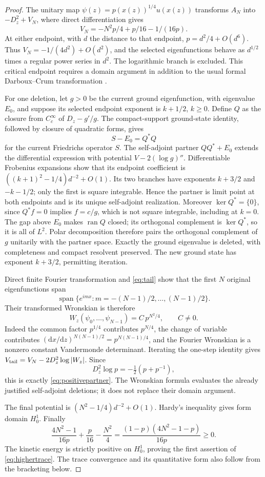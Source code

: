\documentclass[10pt]{article}
\newcommand{\dd}{\mathrm d}
\begin{document}
\begin{proof}
The unitary map $\psi(z)=p(x(z))^{1/4}u(x(z))$ transforms $A_N$
into $-D_z^2+V_N$, where direct differentiation gives
\[
V_N=-N^2p/4+p/16-1/(16p).
\]
At either endpoint, with $d$ the distance to that endpoint,
$p=d^2/4+O(d^6)$. Thus $V_N=-1/(4d^2)+O(d^2)$, and the
selected eigenfunctions behave as $d^{1/2}$ times a regular power
series in $d^2$. The logarithmic branch is excluded. This critical
endpoint requires a domain argument in addition to the usual formal
Darboux--Crum transformation \cite{crum}.

For one deletion, let $g>0$ be the current ground eigenfunction,
with eigenvalue $E_0$, and suppose its selected endpoint exponent is
$k+1/2$, $k\ge0$. Define $Q$ as the closure from $C_c^\infty$ of
$D_z-g'/g$. The compact-support ground-state identity, followed by
closure of quadratic forms, gives
\[
S-E_0=Q^*Q
\]
for the current Friedrichs operator $S$. The self-adjoint partner
$QQ^*+E_0$ extends the differential expression with potential
$V-2(\log g)''$. Differentiable Frobenius expansions show that its
endpoint coefficient is $((k+1)^2-1/4)d^{-2}+O(1)$.
Its two branches have exponents $k+3/2$ and $-k-1/2$; only the
first is square integrable. Hence the partner is limit point at
both endpoints and is its unique self-adjoint realization.
Moreover $\ker Q^*=\{0\}$, since $Q^*f=0$ implies $f=c/g$,
which is not square integrable, including at $k=0$.
The gap above $E_0$ makes $\operatorname{ran}Q$ closed; its orthogonal
complement is $\ker Q^*$, so it is all of $L^2$.
Polar decomposition therefore pairs the orthogonal complement of
$g$ unitarily with the partner space. Exactly the ground eigenvalue
is deleted, with completeness and compact resolvent preserved.
The new ground state has exponent $k+3/2$, permitting iteration.

Direct finite Fourier transformation and \eqref{eq:tail} show that
the first $N$ original eigenfunctions span
\[
\operatorname{span}\{e^{imx}:m=-(N-1)/2,\ldots,(N-1)/2\}.
\]
Their transformed Wronskian is therefore
\[
W_z(\psi_0,\ldots,\psi_{N-1})=C\,p^{N^2/4},\qquad C\ne0.
\]
Indeed the common factor $p^{1/4}$ contributes $p^{N/4}$,
the change of variable contributes
$(\dd x/\dd z)^{N(N-1)/2}=p^{N(N-1)/4}$, and the Fourier
Wronskian is a nonzero constant Vandermonde determinant.
Iterating the one-step identity gives
$V_{\rm tail}=V_N-2D_z^2\log|W_z|$.
Since
\[
D_z^2\log p=-\tfrac12(p+p^{-1}),
\]
this is exactly \eqref{eq:positivepartner}.
The Wronskian formula evaluates the already justified self-adjoint
deletions; it does not replace their domain argument.

The final potential is $(N^2-1/4)d^{-2}+O(1)$.
Hardy's inequality gives form domain $H_0^1$.
Finally
\[
\frac{4N^2-1}{16p}+\frac p{16}-\frac{N^2}{4}
=\frac{(1-p)(4N^2-1-p)}{16p}\ge0.
\]
The kinetic energy is strictly positive on $H_0^1$, proving the
first assertion of \eqref{eq:highertrace}. The trace convergence
and its quantitative form also follow from the bracketing below.
\end{proof}
\end{document}
